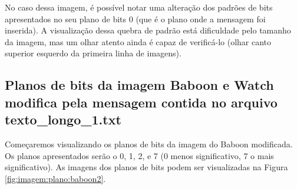 \documentclass{article}
\begin{document}
No caso dessa imagem, é possível notar uma alteração dos padrões de bits apresentados no seu plano de bits 0 (que é o plano onde a mensagem foi inserida). A visualização dessa quebra de padrão está dificuldade pelo tamanho da imagem, mas um olhar atento ainda é capaz de verificá-lo (olhar canto superior esquerdo da primeira linha de imagens).

\subsection{Planos de bits da imagem Baboon e Watch modifica pela mensagem contida no arquivo texto\_longo\_1.txt}

Começaremos visualizando os planos de bits da imagem do Baboon modificada. Os planos apresentados serão o 0, 1, 2, e 7 (0 menos significativo, 7 o mais significativo). As imagens dos planos de bits podem ser visualizadas na Figura \ref{fig:imagem:plano:baboon2}.
\end{document}
